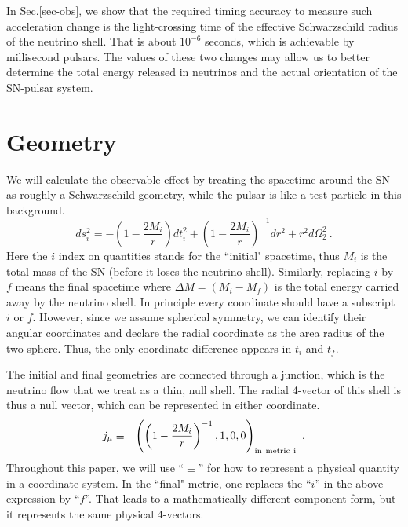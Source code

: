 \documentclass[aps,showpacs,twocolumn,floats,prd,superscriptaddress,nofootinbib]{revtex4}
\begin{document}
In Sec.\ref{sec-obs}, we show that the required timing accuracy to measure such acceleration change is the light-crossing time of the effective Schwarzschild radius of the neutrino shell. That is about $10^{-6}$ seconds, which is achievable by millisecond pulsars. The values of these two changes may allow us to better determine the total energy released in neutrinos and the actual orientation of the SN-pulsar system.

\section{Geometry}
\label{sec-JC}

We will calculate the observable effect by treating the spacetime around the SN as roughly a Schwarzschild geometry, while the pulsar is like a test particle in this background.
\begin{equation}
	ds_i^2 = -\left( 1 -\frac{2M_i}{r}\right) dt_i^2 + \left( 1 -\frac{2M_i}{r} \right)^{-1} dr^2 + r^2 d \Omega_2^2~.	\label{2.1}
\end{equation}
Here the $i$ index on quantities stands for the ``initial" spacetime, thus $M_i$ is the total mass of the SN (before it loses the neutrino shell). Similarly, replacing $i$ by $f$ means the final spacetime where $\Delta M = (M_i-M_f)$ is the total energy carried away by the neutrino shell. In principle every coordinate should have a subscript $i$ or $f$. However, since we assume spherical symmetry, we can identify their angular coordinates and declare the radial coordinate as the area radius of the two-sphere. Thus, the only coordinate difference appears in $t_i$ and $t_f$. 

The initial and final geometries are connected through a junction, which is the neutrino flow that we treat as a thin, null shell. The radial 4-vector of this shell is thus a null vector, which can be represented in either coordinate.
\begin{eqnarray}
j_\mu &\equiv& \left( \left(1-\frac{2M_i}{r}\right)^{-1} ,  1 , 0 , 0 \right)_{\rm in \ metric \ i}~.
\end{eqnarray}
Throughout this paper, we will use ``$\equiv$'' for how to represent a physical quantity in a coordinate system. In the ``final" metric, one replaces the ``$i$'' in the above expression by ``$f$''. That leads to a mathematically different component form, but it represents the same physical 4-vectors.
\end{document}
